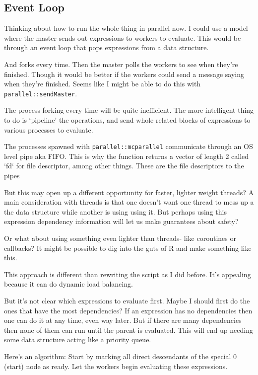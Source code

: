 \documentclass[12pt]{article}
\begin{document}
\subsection{Event Loop}

Thinking about how to run the whole thing in parallel now. I could use a
model where the master sends out expressions to workers to
evaluate. This would be through an event loop that pops expressions from a data
structure.

And forks every time. Then the master polls the workers to see
when they're finished. Though it would be better if the workers could send a
message saying when they're finished. Seems like I might be able to do this
with \texttt{parallel::sendMaster}.

The process forking every time will be quite inefficient. The more intelligent
thing to do is `pipeline' the operations, and send whole related blocks of
expressions to various processes to evaluate.

The processes spawned with \texttt{parallel::mcparallel} communicate
through an OS level pipe aka FIFO. This is why the function returns a vector of
length 2 called `fd` for file descriptor, among other things. These are the
file descriptors to the pipes

But this may open up a different opportunity for faster, lighter weight
threads? A main consideration with threads is that one doesn't want one
thread to mess up a the data structure while another is using using it. But
perhaps using this expression dependency information will let us make
guarantees about safety?

Or what about using something even lighter than threads- like coroutines or
callbacks? It might be possible to dig into the guts of R and make
something like this.

This approach is different than rewriting the script as I did before. It's appealing
because it can do dynamic load balancing.

But it's not clear which expressions to evaluate first. Maybe I should
first do the ones that have the most dependencies? If an expression has no
dependencies then one can do it at any time, even way later. But if there
are many dependencies then none of them can run until the parent is
evaluated. This will end up needing some data structure acting like a priority queue.

Here's an algorithm: Start by marking all direct descendants of the special
0 (start) node as ready. Let the workers begin evaluating these
expressions.
\end{document}
